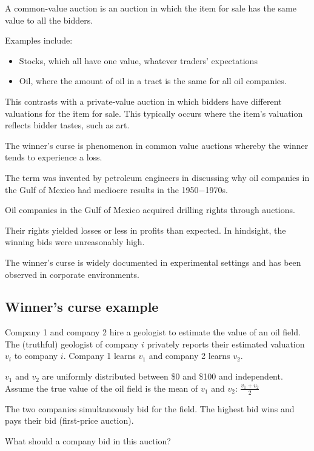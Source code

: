 \documentclass[
  letterpaper,
  DIV=11,
  numbers=noendperiod]{scrreprt}
\begin{document}
A common-value auction is an auction in which the item for sale has the
same value to all the bidders.

Examples include:

\begin{itemize}
\item
  Stocks, which all have one value, whatever traders' expectations
\item
  Oil, where the amount of oil in a tract is the same for all oil
  companies.
\end{itemize}

This contrasts with a private-value auction in which bidders have
different valuations for the item for sale. This typically occurs where
the item's valuation reflects bidder tastes, such as art.

The winner's curse is phenomenon in common value auctions whereby the
winner tends to experience a loss.

The term was invented by petroleum engineers in discussing why oil
companies in the Gulf of Mexico had mediocre results in the 1950−1970s.

Oil companies in the Gulf of Mexico acquired drilling rights through
auctions.

Their rights yielded losses or less in profits than expected. In
hindsight, the winning bids were unreasonably high.

The winner's curse is widely documented in experimental settings and has
been observed in corporate environments.

\hypertarget{winners-curse-example}{%
\subsection{Winner's curse example}\label{winners-curse-example}}

Company 1 and company 2 hire a geologist to estimate the value of an oil
field. The (truthful) geologist of company \(i\) privately reports their
estimated valuation \(v_i\) to company \(i\). Company 1 learns \(v_1\)
and company 2 learns \(v_2\).

\(v_1\) and \(v_2\) are uniformly distributed between \$0 and \$100 and
independent. Assume the true value of the oil field is the mean of
\(v_1\) and \(v_2\): \(\frac{v_1+v_2}{2}\)

The two companies simultaneously bid for the field. The highest bid wins
and pays their bid (first-price auction).

What should a company bid in this auction?
\end{document}
